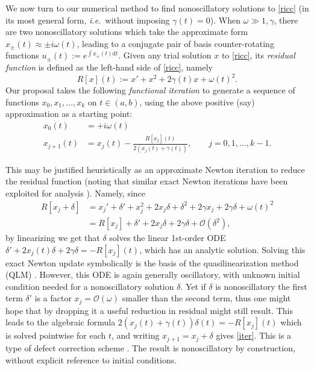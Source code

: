 \documentclass[10pt]{article}
\newcommand{\be}{\begin{equation}}
\newcommand{\ee}{\end{equation}}
\newcommand{\ie}{{\it i.e.\ }}
\renewcommand{\d}{\mathrm{d}} %
\newcommand{\bigO}{{\mathcal O}}
\newcommand{\om}{\omega}
\newcommand{\g}{\gamma}
\newcommand{\Fruzsi}[1]{{\color{blue}#1}}
\begin{document}
We now turn to our numerical method to find nonoscillatory
solutions to \cref{ricc} (in its most general form, \ie without imposing $\g(t) = 0$).
When $\om\gg 1, \g$, there are two nonoscillatory solutions
which take the approximate form
$x_{\pm}(t) \approx \pm i\om(t)$, leading to a conjugate pair of basis
counter-rotating functions $u_{\pm}(t) := e^{\int x_\pm(t) \d t}$.
Given any trial solution $x$ to \cref{ricc}, its \textit{residual
  function} is defined as the left-hand side of \cref{ricc}, namely
\be
\label{R}
R[x](t) := x' + x^2 + 2\g(t)x + \om(t)^2.
\ee
Our proposal takes the following \textit{functional iteration}
to generate a sequence of functions $x_0, x_1, \dots, x_k$
on $t\in(a,b)$,
using the above positive (say) approximation as a starting point:
\begin{align}
x_0(t) &= +i\om(t)
\label{init}
\\
    x_{j+1}(t) &= x_j(t) - \frac{R[x_j](t)}{2 \left( x_j(t) + \g(t) \right)}, \qquad j=0,1,\dots,k-1.
\label{iter}
\end{align}

This may be justified heuristically as an approximate Newton
iteration to reduce the residual function
(noting that similar exact Newton iterations have been
exploited for analysis \cite{heitman2015}).
Namely, since
\begin{align}
    R[x_j + \delta] &= x_j' + \delta' + x_j^2 + 2 x_j \delta + \delta^2 
    + 2\g x_j + 2\g\delta + \om(t)^2 \nonumber \\
    &= R[x_j] + \delta' + 2x_j\delta + 2\g\delta + \bigO(\delta^2), \nonumber
\end{align}
by linearizing we get that $\delta$ solves the linear 1st-order ODE
$\delta' + 2x_j(t) \delta + 2\g \delta  = -R[x_j](t)$,
which has an analytic solution.
Solving this exact Newton update symbolically is the basis of the quasilinearization method (QLM) \cite{bellman1970}.
However, this ODE is again generally oscillatory,
with unknown initial condition needed for a nonoscillatory solution $\delta$.
Yet if $\delta$ is nonoscillatory the first term $\delta'$ is
a factor $x_j = \bigO(\om)$ smaller than the second term, thus
one might hope that by dropping it a useful reduction in residual might
still result.
This leads to the algebraic formula $2\left(x_j(t) + \g(t)\right) \delta(t) = -R[x_j](t)$
which is solved pointwise for each $t$, and
writing $x_{j+1} = x_j + \delta$ gives \cref{iter}.
This is a type of defect correction scheme \cite{bohmer1984}.
The result is nonoscillatory by construction, without explicit reference
to initial conditions.
\end{document}
